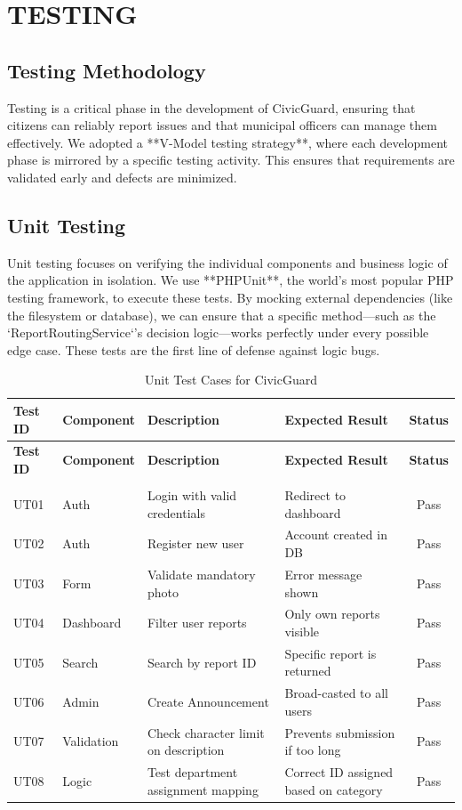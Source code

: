 \chapter{TESTING}

\section{Testing Methodology}
Testing is a critical phase in the development of CivicGuard, ensuring that citizens can reliably report issues and that municipal officers can manage them effectively. We adopted a **V-Model testing strategy**, where each development phase is mirrored by a specific testing activity. This ensures that requirements are validated early and defects are minimized.

\section{Unit Testing}
Unit testing focuses on verifying the individual components and business logic of the application in isolation. We use **PHPUnit**, the world's most popular PHP testing framework, to execute these tests. By mocking external dependencies (like the filesystem or database), we can ensure that a specific method—such as the `ReportRoutingService`'s decision logic—works perfectly under every possible edge case. These tests are the first line of defense against logic bugs.

\renewcommand{\arraystretch}{1.3}
\begin{longtable}{|p{1.5cm}|p{2.5cm}|p{4cm}|p{4cm}|c|}
    \hline
    \textbf{Test ID} & \textbf{Component} & \textbf{Description} & \textbf{Expected Result} & \textbf{Status} \\
    \hline
    \endfirsthead
    \hline
    \textbf{Test ID} & \textbf{Component} & \textbf{Description} & \textbf{Expected Result} & \textbf{Status} \\
    \hline
    \endhead
    \hline
    \caption{Unit Test Cases for CivicGuard} \label{tab:unit_tests} \\
    \endlastfoot

    UT01 & Auth & Login with valid credentials & Redirect to dashboard & Pass \\
    \hline
    UT02 & Auth & Register new user & Account created in DB & Pass \\
    \hline
    UT03 & Form & Validate mandatory photo & Error message shown & Pass \\
    \hline
    UT04 & Dashboard & Filter user reports & Only own reports visible & Pass \\
    \hline
    UT05 & Search & Search by report ID & Specific report is returned & Pass \\
    \hline
    UT06 & Admin & Create Announcement & Broad-casted to all users & Pass \\
    \hline
    UT07 & Validation & Check character limit on description & Prevents submission if too long & Pass \\
    \hline
    UT08 & Logic & Test department assignment mapping & Correct ID assigned based on category & Pass \\
    \hline
\end{longtable}

